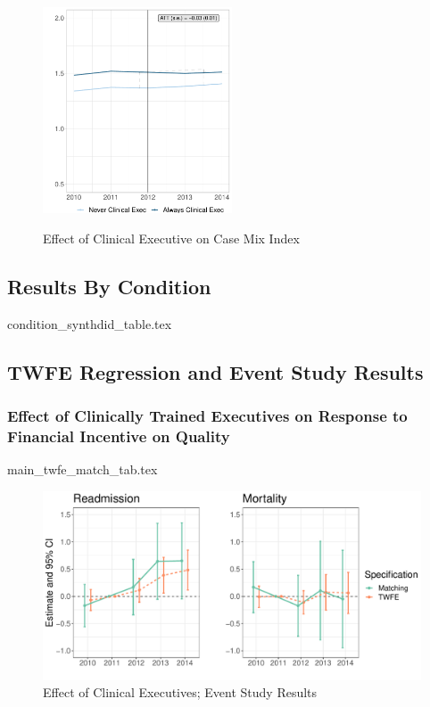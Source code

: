 \documentclass[12pt]{article}
\begin{document}
    \begin{figure}[ht!]
        \centering
        \caption{Effect of Clinical Executive on Case Mix Index}
        \includegraphics[width=0.5\textwidth]{Objects/cmi_md_nomd_synth_graph.pdf}
        \label{fig:main_cmi_clinical}
    \end{figure}


\subsection{Results By Condition}\label{app:condition}


{condition_synthdid_table.tex}

\subsection{TWFE Regression and Event Study Results}\label{app:fullsample}

\subsubsection{Effect of Clinically Trained Executives on Response to Financial Incentive on Quality}

{main_twfe_match_tab.tex}

\begin{figure}[ht!]
    \centering
    \includegraphics[width=.99\linewidth]{Objects/main_twfe_match_eventstudy.pdf}
    \caption{Effect of Clinical Executives; Event Study Results}
    \label{fig:main_twfe_match_es}
\end{figure}





    

    

    

    

    

    

	
	
	
\end{document}
